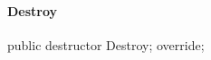 \documentclass{report}
\begin{document}
\paragraph*{Destroy}\hspace*{\fill}

\begin{list}{}{
\setlength{\itemindent}{0cm}
\setlength{\listparindent}{0cm}
\setlength{\leftmargin}{\evensidemargin}
\addtolength{\leftmargin}{\tmplength}
\settowidth{\labelsep}{X}
\addtolength{\leftmargin}{\labelsep}
\setlength{\labelwidth}{\tmplength}
}
\begin{flushleft}
\item[\textbf{Declaration}\hfill]
\begin{ttfamily}
public destructor Destroy; override;\end{ttfamily}


\end{flushleft}
\end{list}
\end{document}
